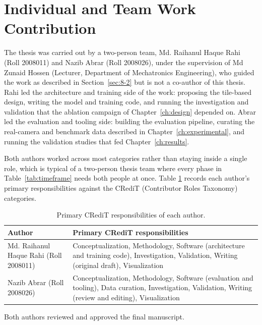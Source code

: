 \FloatBarrier
\section{Individual and Team Work Contribution}
\label{sec:8-5}
The thesis was carried out by a two-person team, Md. Raihanul Haque
Rahi (Roll 2008011) and Nazib Abrar (Roll 2008026), under the
supervision of Md Zunaid Hossen (Lecturer, Department of Mechatronics
Engineering), who guided the work as described in
Section~\ref{sec:8-2} but is not a co-author of this thesis. Rahi
led the architecture and training side of the work: proposing the
tile-based design, writing the model and training code, and running
the investigation and validation that the ablation campaign of
Chapter~\ref{ch:design} depended on. Abrar led the evaluation and
tooling side: building the evaluation pipeline, curating the real-camera
and benchmark data described in Chapter~\ref{ch:experimental}, and
running the validation studies that fed Chapter~\ref{ch:results}.

Both authors worked across most categories rather than staying inside a
single role, which is typical of a two-person thesis team where every
phase in Table~\ref{tab:timeframe} needs both people at once. Table
\ref{tab:credit} records each author's primary responsibilities
against the CRediT (Contributor Roles Taxonomy) categories.

\begin{table}[!htbp]
\centering
\caption{Primary CRediT responsibilities of each author.}
\label{tab:credit}
\small
\begin{tabular}{p{4.0cm}p{9.5cm}}
\toprule
Author & Primary CRediT responsibilities\\
\midrule
Md. Raihanul Haque Rahi (Roll 2008011) & Conceptualization, Methodology, Software (architecture and training code), Investigation, Validation, Writing (original draft), Visualization\\
Nazib Abrar (Roll 2008026) & Conceptualization, Methodology, Software (evaluation and tooling), Data curation, Investigation, Validation, Writing (review and editing), Visualization\\
\bottomrule
\end{tabular}
\end{table}

Both authors reviewed and approved the final manuscript.

\FloatBarrier
